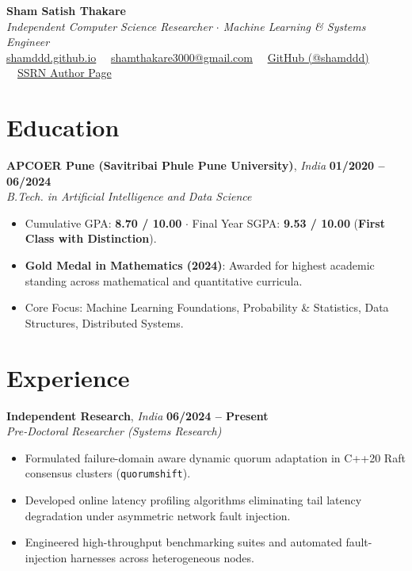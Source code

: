 \documentclass[10pt,letterpaper]{article}
\begin{document}
\pagestyle{empty}

\begin{center}
    {\huge \bfseries Sham Satish Thakare} \\[3pt]
    {\large \itshape Independent Computer Science Researcher $\cdot$ Machine Learning \& Systems Engineer} \\[4pt]
    \href{https://shamddd.github.io/shamthakare.github.io}{shamddd.github.io} \ \textperiodcentered \ \href{mailto:shamthakare3000@gmail.com}{shamthakare3000@gmail.com} \ \textperiodcentered \ \href{https://github.com/shamddd}{GitHub (@shamddd)} \ \textperiodcentered \ \href{https://ssrn.com/author=13130226}{SSRN Author Page}
\end{center}

\vspace{-4pt}

\section*{Education}
\textbf{APCOER Pune (Savitribai Phule Pune University)}, \textit{India} \hfill \textbf{01/2020 -- 06/2024} \\
\textit{B.Tech. in Artificial Intelligence and Data Science}
\begin{itemize}
    \item Cumulative GPA: \textbf{8.70 / 10.00} $\cdot$ Final Year SGPA: \textbf{9.53 / 10.00} (\textbf{First Class with Distinction}).
    \item \textbf{Gold Medal in Mathematics (2024)}: Awarded for highest academic standing across mathematical and quantitative curricula.
    \item Core Focus: Machine Learning Foundations, Probability \& Statistics, Data Structures, Distributed Systems.
\end{itemize}

\vspace{3pt}

\section*{Experience}
\textbf{Independent Research}, \textit{India} \hfill \textbf{06/2024 -- Present} \\
\textit{Pre-Doctoral Researcher (Systems Research)} \\
\begin{itemize}
    \item Formulated failure-domain aware dynamic quorum adaptation in C++20 Raft consensus clusters (\texttt{quorumshift}).
    \item Developed online latency profiling algorithms eliminating tail latency degradation under asymmetric network fault injection.
    \item Engineered high-throughput benchmarking suites and automated fault-injection harnesses across heterogeneous nodes.
\end{itemize}
\end{document}
